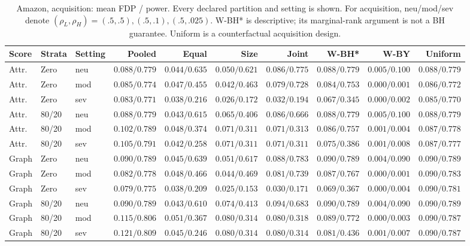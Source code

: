 \begin{table}[t]\centering\scriptsize\setlength{\tabcolsep}{3pt}
\caption{Amazon, acquisition: mean FDP / power. Every declared partition and setting is shown. For acquisition, neu/mod/sev denote $(\rho_L,\rho_H)=(.5,.5),(.5,.1),(.5,.025)$. W-BH* is descriptive; its marginal-rank argument is not a BH guarantee. Uniform is a counterfactual acquisition design.}
\begin{tabular}{lllrrrrrrr}\toprule Score & Strata & Setting & Pooled & Equal & Size & Joint & W-BH* & W-BY & Uniform\\\midrule
Attr. & Zero & neu & $0.088/0.779$ & $0.044/0.635$ & $0.050/0.621$ & $0.086/0.775$ & $0.088/0.779$ & $0.005/0.100$ & $0.088/0.779$ \\
Attr. & Zero & mod & $0.085/0.774$ & $0.047/0.455$ & $0.042/0.463$ & $0.079/0.728$ & $0.084/0.753$ & $0.000/0.001$ & $0.086/0.772$ \\
Attr. & Zero & sev & $0.083/0.771$ & $0.038/0.216$ & $0.026/0.172$ & $0.032/0.194$ & $0.067/0.345$ & $0.000/0.002$ & $0.085/0.770$ \\
Attr. & 80/20 & neu & $0.088/0.779$ & $0.043/0.615$ & $0.065/0.406$ & $0.086/0.666$ & $0.088/0.779$ & $0.005/0.100$ & $0.088/0.779$ \\
Attr. & 80/20 & mod & $0.102/0.789$ & $0.048/0.374$ & $0.071/0.311$ & $0.071/0.313$ & $0.086/0.757$ & $0.001/0.004$ & $0.087/0.778$ \\
Attr. & 80/20 & sev & $0.105/0.791$ & $0.042/0.258$ & $0.071/0.311$ & $0.071/0.311$ & $0.075/0.386$ & $0.001/0.008$ & $0.087/0.777$ \\
Graph & Zero & neu & $0.090/0.789$ & $0.045/0.639$ & $0.051/0.617$ & $0.088/0.783$ & $0.090/0.789$ & $0.004/0.090$ & $0.090/0.789$ \\
Graph & Zero & mod & $0.082/0.778$ & $0.048/0.466$ & $0.044/0.469$ & $0.081/0.739$ & $0.087/0.767$ & $0.000/0.001$ & $0.090/0.783$ \\
Graph & Zero & sev & $0.079/0.775$ & $0.038/0.209$ & $0.025/0.153$ & $0.030/0.171$ & $0.069/0.367$ & $0.000/0.004$ & $0.090/0.781$ \\
Graph & 80/20 & neu & $0.090/0.789$ & $0.043/0.610$ & $0.074/0.413$ & $0.094/0.683$ & $0.090/0.789$ & $0.004/0.090$ & $0.090/0.789$ \\
Graph & 80/20 & mod & $0.115/0.806$ & $0.051/0.367$ & $0.080/0.314$ & $0.080/0.318$ & $0.089/0.772$ & $0.000/0.003$ & $0.090/0.787$ \\
Graph & 80/20 & sev & $0.121/0.809$ & $0.045/0.246$ & $0.080/0.314$ & $0.080/0.314$ & $0.081/0.436$ & $0.001/0.007$ & $0.090/0.787$ \\
\bottomrule\end{tabular}\end{table}

